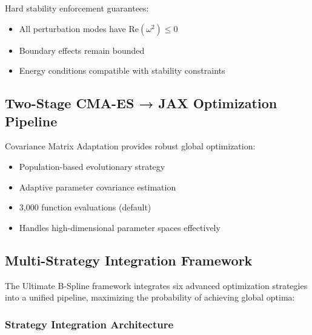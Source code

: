 \documentclass[11pt]{article}
\begin{document}
Hard stability enforcement guarantees:
\begin{itemize}
\item All perturbation modes have $\text{Re}(\omega^2) \leq 0$
\item Boundary effects remain bounded
\item Energy conditions compatible with stability constraints
\end{itemize}

\subsection{Two-Stage CMA-ES → JAX Optimization Pipeline}

Covariance Matrix Adaptation provides robust global optimization:
\begin{itemize}
\item Population-based evolutionary strategy
\item Adaptive parameter covariance estimation
\item 3,000 function evaluations (default)
\item Handles high-dimensional parameter spaces effectively
\end{itemize}

\subsection{Multi-Strategy Integration Framework}

The Ultimate B-Spline framework integrates six advanced optimization strategies into a unified pipeline, maximizing the probability of achieving global optima:

\subsubsection{Strategy Integration Architecture}
\end{document}
